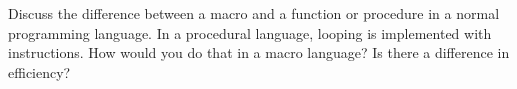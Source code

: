  Discuss the difference between a macro and a function or
  procedure in a normal programming language. In a procedural
  language, looping is implemented with  instructions. How
  would you do that in a macro language? Is there a difference in
  efficiency?
